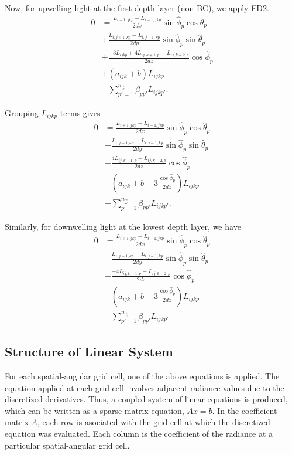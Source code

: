 Now, for upwelling light at the first depth layer (non-BC), we apply FD2.
\begin{equation*}
  \begin{aligned}
    0 &= \frac{L_{i+1,jkp}-L_{i-1,jkp}}{2dx}\sin\hat{\phi}_p\cos\hat{\theta}_p \\
    &+ \frac{L_{i,j+1,kp}-L_{i,j-1,kp}}{2dy}\sin\hat{\phi}_p\sin\hat{\theta}_p \\
    &+ \frac{-3L_{ijkp} + 4L_{ij,k+1,p} - L_{ij,k+2,p}}{2dz}\cos\hat{\phi}_p \\
    &+ (a_{ijk}+b)L_{ijkp} \\
    &- \sum_{p'=1}^{n_{\vec{\omega}}} \beta_{pp'} L_{ijkp'}.
  \end{aligned}
\end{equation*}

Grouping $L_{ijkp}$ terms gives
\begin{equation*}
  \begin{aligned}
    0 &= \frac{L_{i+1,jkp}-L_{i-1,jkp}}{2dx}\sin\hat{\phi}_p\cos\hat{\theta}_p \\
    &+ \frac{L_{i,j+1,kp}-L_{i,j-1,kp}}{2dy}\sin\hat{\phi}_p\sin\hat{\theta}_p \\
    &+ \frac{4L_{ij,k+1,p} - L_{ij,k+2,p}}{2dz}\cos\hat{\phi}_p \\
    &+ \left(a_{ijk}+b - 3\frac{\cos\hat\phi_p}{2dz} \right)L_{ijkp} \\
    &- \sum_{p'=1}^{n_{\vec{\omega}}} \beta_{pp'} L_{ijkp'}.
  \end{aligned}
\end{equation*}

Similarly, for downwelling light at the lowest depth layer, we have
\begin{equation*}
  \begin{aligned}
    0 &= \frac{L_{i+1,jkp}-L_{i-1,jkp}}{2dx}\sin\hat{\phi}_p\cos\hat{\theta}_p \\
    &+ \frac{L_{i,j+1,kp}-L_{i,j-1,kp}}{2dy}\sin\hat{\phi}_p\sin\hat{\theta}_p \\
    &+ \frac{-4L_{ij,k-1,p} + L_{ij,k-2,p}}{2dz}\cos\hat{\phi}_p \\
    &+ \left(a_{ijk}+b + 3\frac{\cos\hat\phi_p}{2dz} \right)L_{ijkp} \\
    &- \sum_{p'=1}^{n_{\vec{\omega}}} \beta_{pp'} L_{ijkp'}
  \end{aligned}
\end{equation*}

\subsection{Structure of Linear System}
For each spatial-angular grid cell, one of the above equations is applied.
The equation applied at each grid cell involves adjacent radiance values due to the discretized derivatives.
Thus, a coupled system of linear equations is produced, which can be written as a sparse matrix equation, $Ax=b$.
In the coefficient matrix $A$, each row is asociated with the grid cell at which the discretized equation was evaluated.
Each column is the coefficient of the radiance at a particular spatial-angular grid cell.

